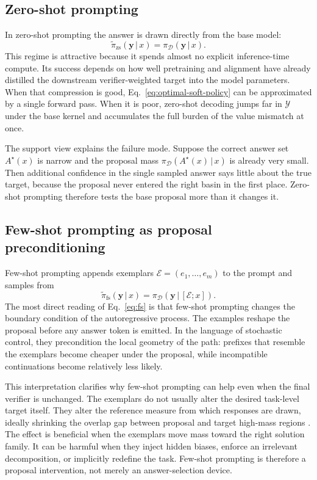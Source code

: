 \documentclass[aps,pre,reprint,superscriptaddress,nofootinbib]{revtex4-2}
\newcommand{\given}{\,|\,}
\newcommand{\cY}{\mathcal{Y}}
\newcommand{\y}{\mathbf{y}}
\begin{document}
\subsection{Zero-shot prompting}

In zero-shot prompting the answer is drawn directly from the base model:
\begin{equation}
\tilde{\pi}_{\mathrm{zs}}(\y\given x)=\pi_{\mathcal D}(\y\given x).
\label{eq:zs}
\end{equation}
This regime is attractive because it spends almost no explicit inference-time compute.
Its success depends on how well pretraining and alignment have already distilled the downstream verifier-weighted target into the model parameters.
When that compression is good, Eq.~\eqref{eq:optimal-soft-policy} can be approximated by a single forward pass.
When it is poor, zero-shot decoding jumps far in $\cY$ under the base kernel and accumulates the full burden of the value mismatch at once.

The support view explains the failure mode.
Suppose the correct answer set $A^\star(x)$ is narrow and the proposal mass $\pi_{\mathcal D}(A^\star(x)\given x)$ is already very small.
Then additional confidence in the single sampled answer says little about the true target, because the proposal never entered the right basin in the first place.
Zero-shot prompting therefore tests the base proposal more than it changes it.

\subsection{Few-shot prompting as proposal preconditioning}

Few-shot prompting appends exemplars $\mathcal E=(e_1,\ldots,e_m)$ to the prompt and samples from
\begin{equation}
\tilde{\pi}_{\mathrm{fs}}(\y\given x)=\pi_{\mathcal D}(\y\given [\mathcal E;x]).
\label{eq:fs}
\end{equation}
The most direct reading of Eq.~\eqref{eq:fs} is that few-shot prompting changes the boundary condition of the autoregressive process.
The examples reshape the proposal before any answer token is emitted.
In the language of stochastic control, they precondition the local geometry of the path: prefixes that resemble the exemplars become cheaper under the proposal, while incompatible continuations become relatively less likely.

This interpretation clarifies why few-shot prompting can help even when the final verifier is unchanged.
The exemplars do not usually alter the desired task-level target itself.
They alter the reference measure from which responses are drawn, ideally shrinking the overlap gap between proposal and target high-mass regions \cite{mukherjee2025test}.
The effect is beneficial when the exemplars move mass toward the right solution family.
It can be harmful when they inject hidden biases, enforce an irrelevant decomposition, or implicitly redefine the task.
Few-shot prompting is therefore a proposal intervention, not merely an answer-selection device.
\end{document}
